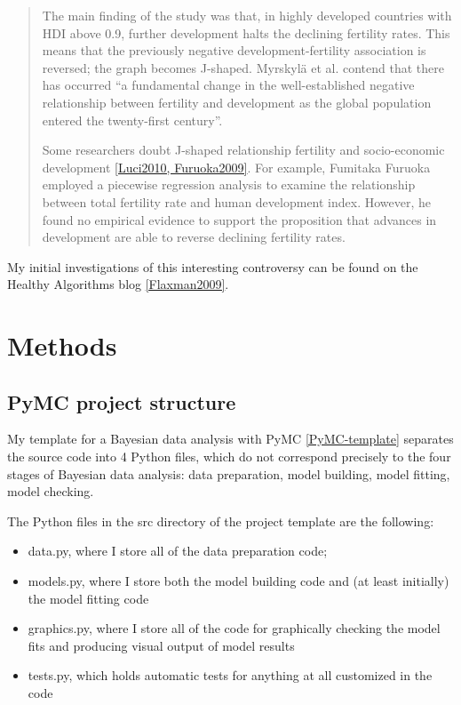 \documentclass[10pt]{bmc_article}
\newenvironment{bmcformat}{\begin{raggedright}\baselineskip20pt\sloppy\setboolean{publ}{false}}{\end{raggedright}\baselineskip20pt\sloppy}
\begin{document}
\begin{bmcformat}
\begin{quote}
The main finding of the study was that, in highly developed countries
with HDI above 0.9, further development halts the declining fertility
rates. This means that the previously negative development-fertility
association is reversed; the graph becomes J-shaped. Myrskylä et
al. contend that there has occurred “a fundamental change in the
well-established negative relationship between fertility and
development as the global population entered the twenty-first
century”.

Some researchers doubt J-shaped relationship fertility and
socio-economic development \ref{Luci2010, Furuoka2009}. For example,
Fumitaka Furuoka employed a piecewise regression analysis to
examine the relationship between total fertility rate and human
development index. However, he found no empirical evidence to support
the proposition that advances in development are able to reverse
declining fertility rates.
\end{quote}

My initial investigations of this interesting controversy can be found
on the Healthy Algorithms blog \ref{Flaxman2009}.


\section*{Methods}
  \subsection*{PyMC project structure}
  My template for a Bayesian data analysis with PyMC
  \ref{PyMC-template} separates the source code into 4 Python files,
  which do not correspond precisely to the four stages of Bayesian
  data analysis: data preparation, model building, model fitting,
  model checking.

  The Python files in the src directory of the project template are the following:
\begin{itemize}
\item data.py, where I store all of the data preparation code;
\item models.py, where I store both the model building code and (at
  least initially) the model fitting code
\item graphics.py, where I store all of the code for graphically checking the model fits and producing visual output of model results
\item tests.py, which holds automatic tests for anything at all customized in the code
\end{itemize}


\end{bmcformat}
\end{document}
